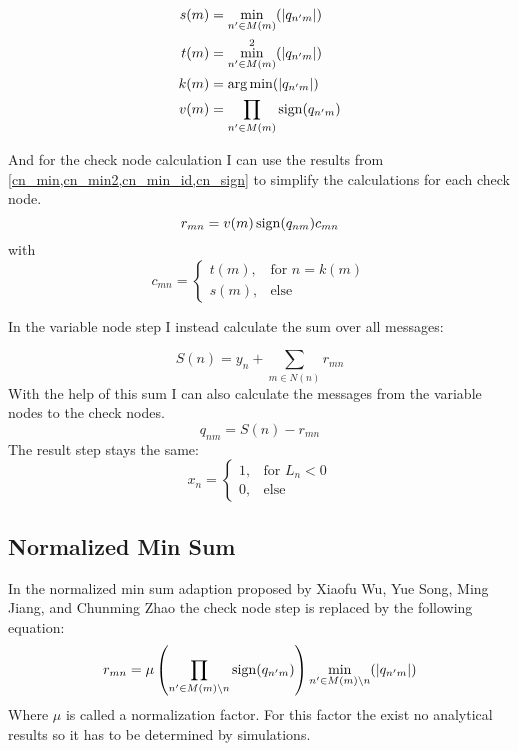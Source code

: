 \begin{align}
    s(m) & = \min_{n' \in M(m)}(\left|q_{n'm}\right|) \label{cn_min}\\
    t(m) & = \min_{n' \in M(m)}^2(\left|q_{n'm}\right|) \label{cn_min2}\\
    k(m) & = \operatorname*{arg\,min} (\left|q_{n'm}\right|) \label{cn_min_id}\\
    v(m) & =  \prod_{n' \in M(m)}\operatorname{sign}(q_{n'm}) \label{cn_sign}
\end{align}

And for the check node calculation I can use the results from \cref{cn_min,cn_min2,cn_min_id,cn_sign} to simplify the calculations for each check node.
\begin{equation}
    r_{mn} = v(m) \operatorname{sign}(q_{nm}) c_{mn} \label{cn_loc}
\end{equation}
with
\begin{equation}
    c_{mn} = \begin{cases}
        t(m), & \text{for } n = k(m) \\
        s(m), & \text{else}
    \end{cases}
\end{equation}

In the variable node step I instead calculate the sum over all messages:

\begin{equation}
    S(n) = y_n + \sum_{m \in N(n)}r_{mn}  \label{vn_sum}
\end{equation}
With the help of this sum I can also calculate the messages from the variable nodes to the check nodes.
\begin{equation}
    q_{nm} = S(n) - r_{mn} \label{vn_loc}
\end{equation}
The result step stays the same:
\begin{equation}
    x_n = \begin{cases}
        1, & \text{for } L_n < 0 \\
        0, & \text{else}
    \end{cases}
\end{equation}

\subsection{Normalized Min Sum}
In the normalized min sum adaption proposed by Xiaofu Wu, Yue Song, Ming Jiang, and Chunming Zhao\cite{WuSo10} the check node step is replaced by the following equation:
\begin{equation}
    r_{mn} = \mu \left( \prod_{n' \in M(m) \setminus n}\operatorname{sign}(q_{n'm}) \right) \min_{n' \in M(m) \setminus n}(\left|q_{n'm}\right|)
\end{equation}
Where $\mu$ is called a normalization factor. For this factor the exist no analytical results so it has to be determined by simulations.

